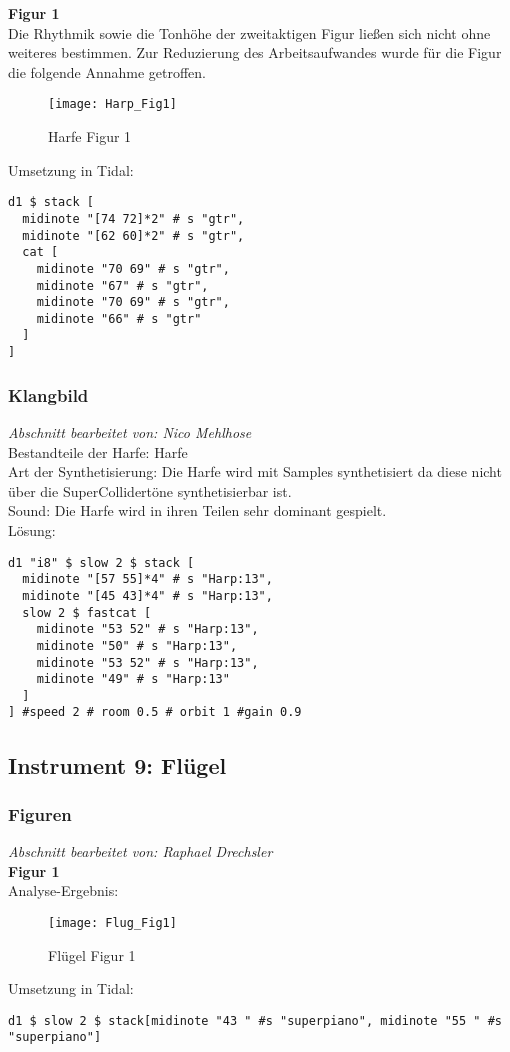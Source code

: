 \documentclass[
10pt, %
a4paper, %
oneside, %
headinclude,footinclude, %
BCOR5mm, %
]{scrartcl}
\begin{document}
\noindent\textbf{Figur 1}\\
Die Rhythmik sowie die Tonhöhe der zweitaktigen Figur ließen sich nicht ohne weiteres bestimmen. Zur Reduzierung des Arbeitsaufwandes wurde für die Figur die folgende Annahme getroffen. 
\begin{figure}[h]
	\centering 
	\texttt{[image: Harp\_Fig1]} 
	\caption{Harfe Figur 1}
\end{figure}

\noindent Umsetzung in Tidal:
\begin{lstlisting}
d1 $ stack [
  midinote "[74 72]*2" # s "gtr",
  midinote "[62 60]*2" # s "gtr",
  cat [
    midinote "70 69" # s "gtr",
    midinote "67" # s "gtr",
    midinote "70 69" # s "gtr",
    midinote "66" # s "gtr"
  ]
] 
\end{lstlisting}



\subsubsection{Klangbild}
\textit{Abschnitt bearbeitet von: Nico Mehlhose}\\
\noindent Bestandteile der Harfe: Harfe\\
Art der Synthetisierung: Die Harfe wird mit Samples\cite{Orch} synthetisiert da diese nicht über die SuperCollidertöne synthetisierbar ist.\\
Sound: Die Harfe wird in ihren Teilen sehr dominant gespielt.\\
Lösung:
\begin{lstlisting}
d1 "i8" $ slow 2 $ stack [
  midinote "[57 55]*4" # s "Harp:13",
  midinote "[45 43]*4" # s "Harp:13",
  slow 2 $ fastcat [
    midinote "53 52" # s "Harp:13",
    midinote "50" # s "Harp:13",
    midinote "53 52" # s "Harp:13",
    midinote "49" # s "Harp:13"
  ]
] #speed 2 # room 0.5 # orbit 1 #gain 0.9
\end{lstlisting}


\subsection{Instrument 9: Flügel}
\subsubsection{Figuren}
\textit{Abschnitt bearbeitet von: Raphael Drechsler}\\

\noindent\textbf{Figur 1}\\
Analyse-Ergebnis:
\begin{figure}[h]
	\centering 
	\texttt{[image: Flug\_Fig1]} 
	\caption{Flügel Figur 1}
\end{figure}
\noindent Umsetzung in Tidal:
\begin{lstlisting}
d1 $ slow 2 $ stack[midinote "43 " #s "superpiano", midinote "55 " #s "superpiano"]
\end{lstlisting}
\end{document}
